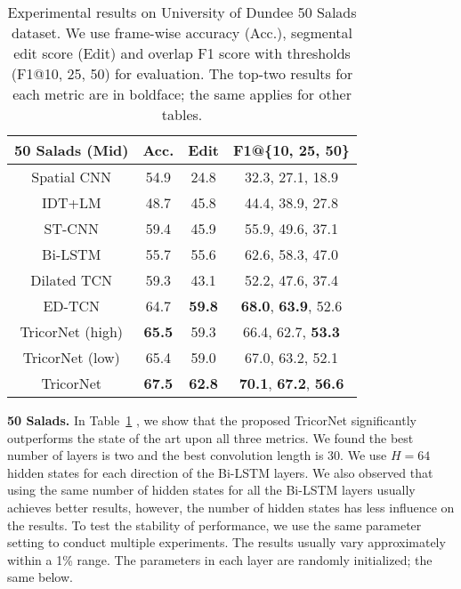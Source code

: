 \documentclass{article}
\begin{document}
\begin{table}
	\centering
	\caption{Experimental results on University of Dundee 50 Salads dataset. We use frame-wise accuracy (Acc.), segmental edit score (Edit) and overlap F1 score with thresholds (F1@10, 25, 50) for evaluation. The top-two results for each metric are in boldface; the same applies for other tables.}
	\label{salads}
	\begin{tabular}{|c|c|c|c|}
		\hline
		\textbf{50 Salads (Mid)} & \textbf{Acc.} & \textbf{Edit} & \textbf{F1@\{10, 25, 50\}} \\ \hline
		Spatial CNN \cite{scnn}              & 54.9              & 24.8                & 32.3, 27.1, 18.9                \\
		IDT+LM   \cite{richard}                & 48.7              & 45.8                & 44.4, 38.9, 27.8                \\
		ST-CNN   \cite{scnn}                & 59.4              & 45.9                & 55.9, 49.6, 37.1                \\
		Bi-LSTM                  & 55.7              & 55.6                & 62.6, 58.3, 47.0                \\
		Dilated TCN    \cite{LeFlViCVPR2017}          & 59.3              & 43.1                & 52.2, 47.6, 37.4                \\
		ED-TCN       \cite{LeFlViCVPR2017}            & 64.7             & \textbf{59.8}                & \textbf{68.0}, \textbf{63.9}, 52.6                \\ \hline
		TricorNet (high)                     & \textbf{65.5}     & 59.3       & 66.4, 62.7, \textbf{53.3}       \\
		TricorNet (low)                     & 65.4     & 59.0      & 67.0, 63.2, 52.1      \\
		TricorNet                     & \textbf{67.5}     & \textbf{62.8}       & \textbf{70.1}, \textbf{67.2}, \textbf{56.6}       \\ \hline
	\end{tabular}
\end{table}

\noindent \textbf{50 Salads.} \quad In Table~\ref{salads} , we show that the proposed TricorNet significantly outperforms the state of the art upon all three metrics. We found the best number of layers is two and the best convolution length is 30. We use $H = 64$ hidden states for each direction of the Bi-LSTM layers. We also observed that using the same number of hidden states for all the Bi-LSTM layers usually achieves better results, however, the number of hidden states has less influence on the results. To test the stability of performance, we use the same parameter setting to conduct multiple experiments. The results usually vary approximately within a 1\% range. The parameters in each layer are randomly initialized; the same below.
\end{document}
